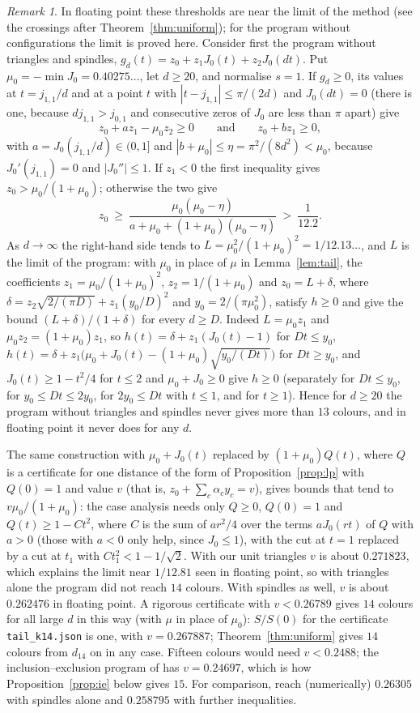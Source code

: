 \documentclass[11pt,a4paper]{amsart}
\theoremstyle{definition}
\theoremstyle{remark}
\newtheorem*{remark}{Remark}
\begin{document}
\begin{remark}
In floating point these thresholds are near the limit of the method (see the crossings after
Theorem~\ref{thm:uniform}); for the program without configurations the limit is proved here. Consider first the program without triangles and spindles,
$g_d(t)=z_0+z_1J_0(t)+z_2J_0(dt)$. Put $\mu_0=-\min J_0=0.40275\ldots$, let $d\ge20$, and normalise $s=1$. If
$g_d\ge0$, its values at $t=j_{1,1}/d$ and at a point $t$ with $|t-j_{1,1}|\le\pi/(2d)$ and $J_0(dt)=0$
(there is one, because $dj_{1,1}>j_{0,1}$ and consecutive zeros of $J_0$ are less than $\pi$ apart) give
\[
z_0+az_1-\mu_0z_2\ge0\qquad\text{and}\qquad z_0+bz_1\ge0,
\]
with $a=J_0(j_{1,1}/d)\in(0,1]$ and $|b+\mu_0|\le\eta=\pi^2/(8d^2)<\mu_0$, because $J_0'(j_{1,1})=0$ and
$|J_0''|\le1$. If $z_1<0$ the first inequality gives $z_0>\mu_0/(1+\mu_0)$; otherwise the two give
\[
z_0\ \ge\ \frac{\mu_0(\mu_0-\eta)}{a+\mu_0+(1+\mu_0)(\mu_0-\eta)}\ >\ \frac1{12.2}.
\]
As $d\to\infty$ the right-hand side tends to $L=\mu_0^2/(1+\mu_0)^2=1/12.13\ldots$, and $L$ is the limit of the
program: with $\mu_0$ in place of $\mu$ in Lemma~\ref{lem:tail}, the coefficients $z_1=\mu_0/(1+\mu_0)^2$,
$z_2=1/(1+\mu_0)$ and $z_0=L+\delta$, where $\delta=z_2\sqrt{2/(\pi D)}+z_1(y_0/D)^2$ and $y_0=2/(\pi\mu_0^2)$, satisfy
$h\ge0$ and give the bound $(L+\delta)/(1+\delta)$ for every $d\ge D$. Indeed $L=\mu_0z_1$ and $\mu_0z_2=(1+\mu_0)z_1$,
so $h(t)=\delta+z_1(J_0(t)-1)$ for $Dt\le y_0$, $h(t)=\delta+z_1\bigl(\mu_0+J_0(t)-(1+\mu_0)\sqrt{y_0/(Dt)}\bigr)$
for $Dt\ge y_0$, and $J_0(t)\ge1-t^2/4$ for $t\le2$ and $\mu_0+J_0\ge0$ give $h\ge0$ (separately for $Dt\le y_0$,
for $y_0\le Dt\le2y_0$, for $2y_0\le Dt$ with $t\le1$, and for $t\ge1$). Hence for $d\ge20$ the program without
triangles and spindles never gives more than $13$ colours, and in floating point it never does for any $d$.

The same construction with $\mu_0+J_0(t)$ replaced by $(1+\mu_0)Q(t)$, where $Q$ is a certificate for one distance
of the form of Proposition~\ref{prop:lp} with $Q(0)=1$ and value $v$ (that is, $z_0+\sum_c\alpha_cy_c=v$), gives bounds that
tend to $v\mu_0/(1+\mu_0)$: the case analysis needs only $Q\ge0$, $Q(0)=1$ and $Q(t)\ge1-Ct^2$, where $C$ is the sum
of $ar^2/4$ over the terms $aJ_0(rt)$ of $Q$ with $a>0$ (those with $a<0$ only help, since $J_0\le1$), with the cut
at $t=1$ replaced by a cut at $t_1$ with $Ct_1^2<1-1/\sqrt2$. With our unit triangles $v$ is about $0.271823$, which explains the limit near $1/12.81$
seen in floating point, so with triangles alone the program did not reach $14$ colours. With spindles as well, $v$ is
about $0.262476$ in floating point. A rigorous certificate with $v<0.26789$ gives $14$ colours for all large $d$ in
this way (with $\mu$ in place of $\mu_0$): $S/S(0)$ for the certificate \texttt{tail\_k14.json} is one, with
$v=0.267887$; Theorem~\ref{thm:uniform} gives $14$ colours from $d_{14}$ on in any case. Fifteen colours would need $v<0.2488$;
the inclusion--exclusion program of \cite{ACMVZ} has $v=0.24697$, which is how Proposition~\ref{prop:ie} below gives
$15$. For comparison,
\cite{KMOR} reach (numerically) $0.26305$ with spindles alone and $0.258795$ with further inequalities.
\end{remark}
\end{document}
